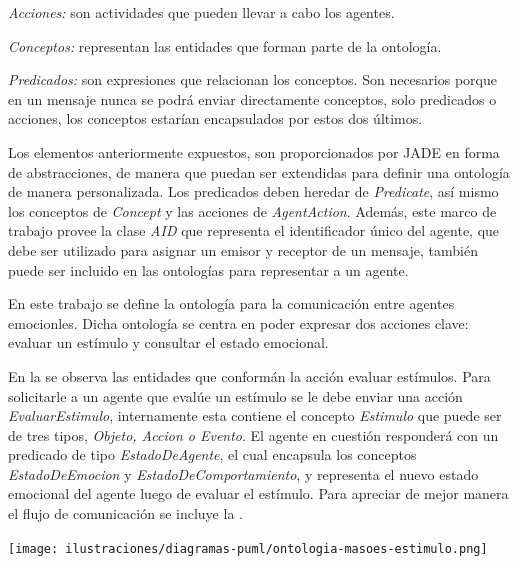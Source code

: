 \begin{vinetas}
    \item \textit{Acciones:} son actividades que pueden llevar a cabo los agentes.
    \item \textit{Conceptos:} representan las entidades que forman parte de la ontología.
    \item \textit{Predicados:} son expresiones que relacionan los conceptos. Son
    necesarios porque en un mensaje nunca se podrá enviar directamente conceptos, solo
    predicados o acciones, los conceptos estarían encapsulados por estos dos últimos.
\end{vinetas}

Los elementos anteriormente expuestos, son proporcionados por JADE en forma de abstracciones,
de manera que puedan ser extendidas para definir una ontología de manera personalizada.
Los predicados deben heredar de \textit{Predicate},
así mismo los conceptos de \textit{Concept} y las acciones de \textit{AgentAction}. Además,
este marco de trabajo provee la clase \textit{AID} que representa el identificador único del agente,
que debe ser utilizado para asignar un emisor y receptor de un mensaje, también puede ser incluido en las
ontologías para representar a un agente.

En este trabajo se define la ontología
 para la
comunicación entre agentes emocionles. Dicha ontología se centra en
poder expresar dos acciones clave: evaluar un estímulo
y consultar el estado emocional.

En la  se observa las entidades que conformán la
acción evaluar estímulos.
Para solicitarle a un agente que evalúe un estímulo se le debe enviar
 una acción \textit{EvaluarEstimulo},
internamente esta contiene el concepto \textit{Estimulo} que puede ser de tres tipos,
\textit{Objeto, Accion o Evento}.
El agente en cuestión responderá con un predicado de tipo \textit{EstadoDeAgente},
el cual encapsula los conceptos \textit{EstadoDeEmocion}
y \textit{EstadoDeComportamiento}, y representa el nuevo estado emocional del agente
luego de evaluar el estímulo.
Para apreciar de mejor manera el flujo de comunicación se incluye la .

\begin{ilustracion}[fuente=\yo, etiqueta=ontologia-masoes-estimulo, titulo={Ontología para MASOES, Acción Evaluar Estímulo}]
\texttt{[image: ilustraciones/diagramas-puml/ontologia-masoes-estimulo.png]}
\end{ilustracion}

